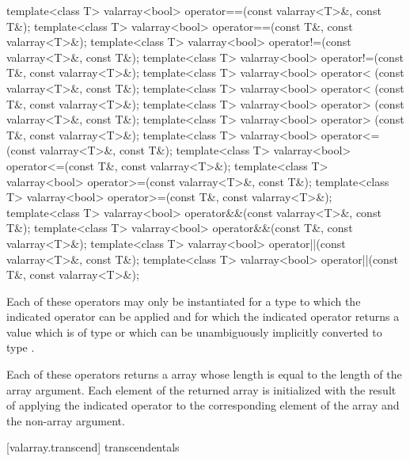 %
%
%
%
%
%
%
%
\begin{itemdecl}
template<class T> valarray<bool> operator==(const valarray<T>&, const T&);
template<class T> valarray<bool> operator==(const T&, const valarray<T>&);
template<class T> valarray<bool> operator!=(const valarray<T>&, const T&);
template<class T> valarray<bool> operator!=(const T&, const valarray<T>&);
template<class T> valarray<bool> operator< (const valarray<T>&, const T&);
template<class T> valarray<bool> operator< (const T&, const valarray<T>&);
template<class T> valarray<bool> operator> (const valarray<T>&, const T&);
template<class T> valarray<bool> operator> (const T&, const valarray<T>&);
template<class T> valarray<bool> operator<=(const valarray<T>&, const T&);
template<class T> valarray<bool> operator<=(const T&, const valarray<T>&);
template<class T> valarray<bool> operator>=(const valarray<T>&, const T&);
template<class T> valarray<bool> operator>=(const T&, const valarray<T>&);
template<class T> valarray<bool> operator&&(const valarray<T>&, const T&);
template<class T> valarray<bool> operator&&(const T&, const valarray<T>&);
template<class T> valarray<bool> operator||(const valarray<T>&, const T&);
template<class T> valarray<bool> operator||(const T&, const valarray<T>&);
\end{itemdecl}

\begin{itemdescr}
\pnum
Each of these operators may only be instantiated for a type 
to which the indicated operator can be applied and for which
the indicated operator returns a value which is of type 
or which can be unambiguously implicitly converted to type .

\pnum
Each of these operators returns a  array whose
length is equal to the length of the array argument.
Each element
of the returned array is initialized with the result of applying the
indicated operator to the corresponding element of the array and the non-array argument.
\end{itemdescr}

[valarray.transcend]{ transcendentals}

